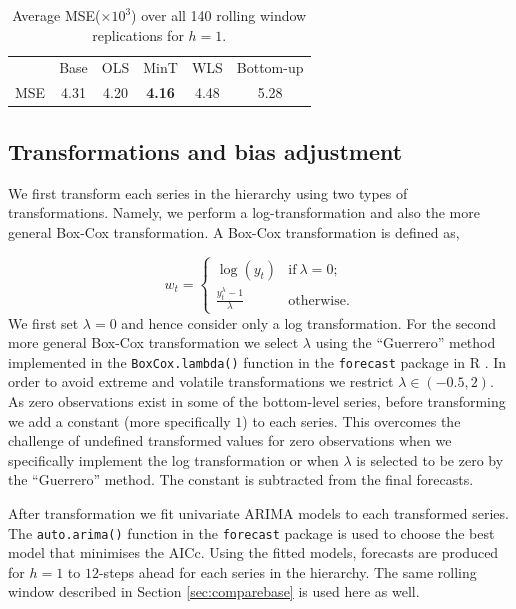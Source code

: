 \documentclass[12pt]{article}
\theoremstyle{definition}
\begin{document}
\begin{table}[H]
	\caption {Average {MSE($\times 10^3$)} over all 140 rolling window replications for $h=1$.} \label{tab:AveraveDifferences}
	\centering \tabcolsep=0.4cm
		\begin{tabular}{lccccc}
	\toprule
            & Base & OLS & MinT & WLS & Bottom-up \\
     MSE    & 4.31 & 4.20 & \textbf{4.16} & 4.48 & 5.28 \\
    \bottomrule
    \end{tabular}
\end{table}

	\subsection{Transformations and bias adjustment}
	
	We first transform each series in the hierarchy using two types of transformations. Namely, we perform a log-transformation and also the more general Box-Cox transformation. A Box-Cox transformation is defined as,
		
\begin{equation*} \label{eq:BoxCox_transformation}
	w_t =
	\begin{cases}
	\log(y_t) & \text{if}~\lambda=0;\\
	\frac{y_t^\lambda - 1}{\lambda}  & \text{otherwise}.
	\end{cases}
\end{equation*}
We first set $\lambda=0$ and hence consider only a log transformation. For the second more general Box-Cox transformation we select $\lambda$ using the ``Guerrero'' method \citep{guerrero1993time} implemented in the \verb|BoxCox.lambda()| function in the \verb|forecast| package in R \citep{Rforecast}. In order to avoid extreme and volatile transformations we restrict $\lambda \in (-0.5,2)$. As zero observations exist in some of the bottom-level series, before transforming we add a constant (more specifically $1$) to each series. This overcomes the challenge of undefined transformed values for zero observations when we specifically implement the log transformation or when $\lambda$ is selected to be zero by the ``Guerrero'' method. The constant is subtracted from the final forecasts.

After transformation we fit univariate ARIMA models to each transformed series. The \verb|auto.arima()| function in the \verb|forecast| package is used to choose the best model that minimises the AICc. Using the fitted models, forecasts are produced for $h=1$ to $12$-steps ahead for each series in the hierarchy. The same rolling window described in Section \ref{sec:comparebase} is used here as well.
\end{document}
